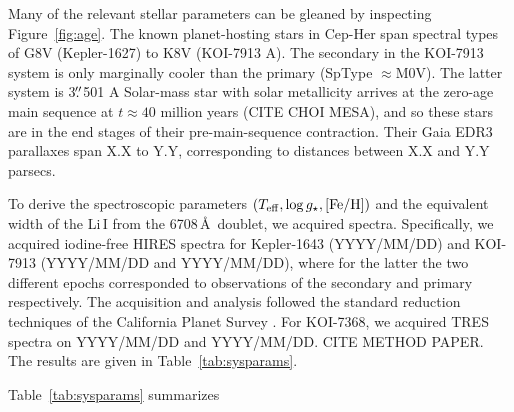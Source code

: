 \documentclass[12pt,twocolumn,linenumbers]{aastex63}
\newcommand{\cn}{Cep-Her complex} %
\begin{document}


Many of the relevant stellar parameters can be gleaned by inspecting
Figure~\ref{fig:age}.  The known planet-hosting stars in Cep-Her span
spectral types of G8V (Kepler-1627) to K8V (KOI-7913 A).  The
secondary in the KOI-7913 system is only marginally cooler than the
primary (SpType $\approx$M0V).
The latter system is 3$\mbox{$.\!\!^{\prime\prime}$}$501 
A Solar-mass star with solar metallicity arrives at the zero-age main
sequence at $t\approx40$ million years (CITE CHOI MESA), and so these
stars are in the end stages of their pre-main-sequence contraction.
Their Gaia EDR3 parallaxes span X.X to Y.Y, corresponding to distances
between X.X and Y.Y parsecs.

To derive the spectroscopic parameters $(T_{\rm eff}, \log g_\star,
[{\rm Fe/H}])$ and  the equivalent width of the Li\,\textsc{I}
from the 6708\,\AA\ doublet, we acquired spectra.  Specifically, we
acquired iodine-free HIRES spectra for Kepler-1643 (YYYY/MM/DD) and
KOI-7913 (YYYY/MM/DD and YYYY/MM/DD), where for the latter the two
different epochs corresponded to observations of the secondary and
primary respectively.  The acquisition and analysis followed the
standard reduction techniques of the California Planet Survey
\citep{howard_cps_2010}.  For KOI-7368, we acquired TRES spectra on
YYYY/MM/DD and YYYY/MM/DD.  CITE METHOD PAPER.
The results are given in Table~\ref{tab:sysparams}.

Table~\ref{tab:sysparams} summarizes
%
%
%
%
%
\end{document}
